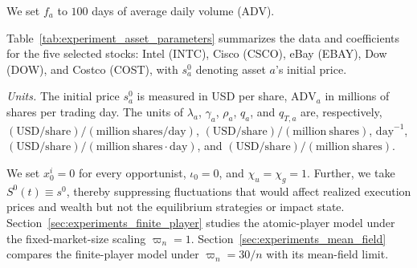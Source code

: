 \documentclass[12pt]{article}
\numberwithin{equation}{section}
\theoremstyle{definition}
\begin{document}
We set \(f_a\) to \(100\) days of average daily volume (ADV).

Table~\ref{tab:experiment_asset_parameters} summarizes the data and
coefficients for the five selected stocks: Intel (INTC), Cisco (CSCO), eBay
(EBAY), Dow (DOW), and Costco (COST), with \(s_a^0\) denoting asset \(a\)'s
initial price.

\begin{table}[H]
\centering
\caption{Asset-Level Model Inputs and Coefficients}
\label{tab:experiment_asset_parameters}
\scriptsize
{}
\par\vspace{0.5\baselineskip}
\begin{minipage}{0.98\textwidth}
\footnotesize
\raggedright
\emph{Units.} The initial price \(s_a^0\) is measured in USD per share,
\(\mathrm{ADV}_a\) in millions of shares per trading day. The units of
\(\lambda_a\), \(\gamma_a\), \(\rho_a\),
\(q_a\), and \(q_{T,a}\) are, respectively,
\((\mathrm{USD/share})/(\mathrm{million\ shares/day})\),
\((\mathrm{USD/share})/(\mathrm{million\ shares})\),
\(\mathrm{day}^{-1}\),
\((\mathrm{USD/share})/(\mathrm{million\ shares}\cdot\mathrm{day})\), and
\((\mathrm{USD/share})/(\mathrm{million\ shares})\).
\par
\end{minipage}
\end{table}


We set \(x_0^i=0\) for every opportunist, \(\iota_0=0\), and
\(\chi_u=\chi_g=1\).
Further, we take \(S^0(t)\equiv s^0\), thereby suppressing fluctuations that would
affect realized execution prices and wealth but not the equilibrium strategies
or impact state.
Section~\ref{sec:experiments_finite_player} studies the
atomic-player model under the fixed-market-size scaling \(\varpi_n=1\).
Section~\ref{sec:experiments_mean_field} compares the finite-player model under
\(\varpi_n=30/n\) with its mean-field limit.
\end{document}
